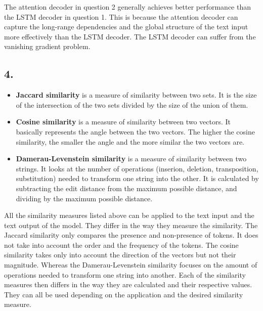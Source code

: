 \documentclass[11pt]{article}
\begin{document}
The attention decoder in question 2 generally achieves better performance than the LSTM decoder in question 1.
This is because the attention decoder can capture the long-range dependencies and the global structure of the text input more effectively than the LSTM decoder.
The LSTM decoder can suffer from the vanishing gradient problem.
\subsection{4.}
\begin{itemize}
    \item \textbf{Jaccard similarity} is a measure of similarity between two sets.
It is the size of the intersection of the two sets divided by the size of the union of them.

    \item \textbf{Cosine similarity} is a measure of similarity between two vectors.
It basically represents the angle between the two vectors.
The higher the cosine similarity, the smaller the angle and the more similar the two vectors are.

    \item \textbf{Damerau-Levenstein similarity} is a measure of similarity between two strings.
It looks at the number of operations (inserion, deletion, transposition, substitution) needed to transform one string into the other.
It is calculated by subtracting the edit distance from the maximum possible distance, and dividing by the maximum possible distance.
\end{itemize}


All the similarity measures listed above can be applied to the text input and the text output of the model.
They differ in the way they measure the similarity.
The Jaccard similarity only compares the presence and non-presence of tokens.
It does not take into account the order and the frequency of the tokens.
The cosine similarity takes only into account the direction of the vectors but not their magnitude.
Whereas the Damerau-Levenstein similarity focuses on the amount of operations needed to transform one string into another.
Each of the similarity measures then differs in the way they are calculated and their respective values.
They can all be used depending on the application and the desired similarity measure.
\end{document}
